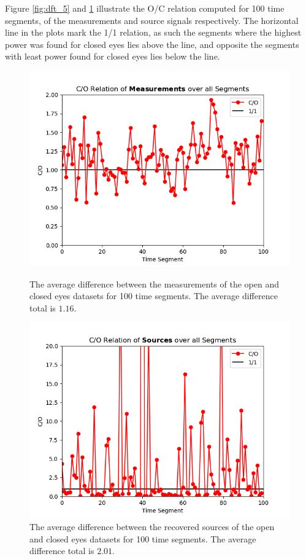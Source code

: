 Figure \ref{fig:dft_5} and \ref{fig:dft_6} illustrate the O/C relation computed for 100 time segments, of the measurements and source signals respectively. The horizontal line in the plots mark the 1/1 relation, as such the segments where the highest power was found for closed eyes lies above the line, and opposite the segments with least power found for closed eyes lies below the line.      
\begin{figure}[H]
\begin{widepage}
    \begin{minipage}[t]{.49\textwidth}
\centering
\includegraphics[width=1\linewidth]{figures/ch_7/DFT_Y_Difference.png}
\caption{The average difference between the measurements of the open and closed eyes datasets for 100 time segments. The average difference total is $1.16$.}
\label{fig:dft_5}
\end{minipage} 
\hspace{.5cm}
\begin{minipage}[t]{.49\textwidth}
\centering
\includegraphics[width=1\linewidth]{figures/ch_7/DFT_X_Difference.png}
\caption{The average difference between the recovered sources of the open and closed eyes datasets for 100 time segments. The average difference total is $2.01$.}
	\label{fig:dft_6}
    \end{minipage}
\end{widepage}
\end{figure}
